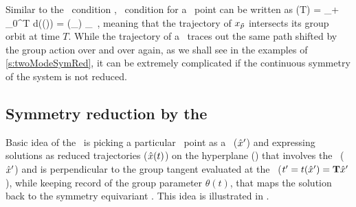 \documentclass[aip,cha,
reprint,
secnumarabic,
nofootinbib, tightenlines,
nobibnotes, showkeys, showpacs,
groupedaddress,
]{revtex4-1}
\begin{document}
Similar to the \reqv\ condition , \rpo\ condition for a \statesp\ point can be written as
\beq
  \ssp (T) = \ssp_\rpprime  + \int_0^T d\tau \vel(\ssp (\tau)) = \LieEl (\theta_\rpprime ) \ssp_\rpprime 
  \,,
meaning that the trajectory of $x_{\tilde{p}}$ intersects its group orbit at
time $T$. While the trajectory of a \rpo\ traces out the same path shifted 
by the group action over and over again, as we shall see in the examples of 
\ref{s:twoModeSymRed}, it can be extremely complicated if the continuous 
symmetry of the system is not reduced.

\subsection{Symmetry reduction by the \mslices}
\label{s:slice}

Basic idea of the \mslices\ is picking a particular \statesp\ point as a \template\ 
(${\hat{x}'}$) and expressing solutions as reduced trajectories ($\hat{x} (t)$) on the hyperplane 
(\pSRed) that involves the \template\ (${\hat{x}'}$) and is perpendicular to the group 
tangent evaluated at the \template\ ($t'_{} = t({\hat{x}'}) = \mathbf{T} {\hat{x}'}$), 
while keeping record of the group parameter $\theta (t)$, that maps the solution
back to the symmetry equivariant \statesp . This idea is illustrated in .
\end{document}
